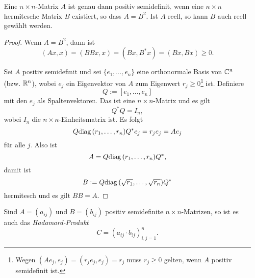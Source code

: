 \begin{thm} %
  Eine $n \times n$-Matrix $A$ ist genau dann positiv semidefinit, wenn eine $n
  \times n$ hermitesche Matrix $B$ existiert, so dass $A = B^2$. Ist $A$ reell,
  so kann $B$ auch reell gewählt werden.
\end{thm}

\begin{proof}
  Wenn $A = B^2$, dann ist
  \[ (Ax,x) = (BBx,x) = (Bx,B^* x) = (Bx, Bx) \ge 0. \]

  Sei $A$ positiv semidefinit und sei $\{e_1, \ldots, e_n\}$ eine orthonormale
  Basis von $\mathbb{C}^n$ (bzw. $\mathbb{R}^n$), wobei $e_j$ ein Eigenvektor von $A$
  zum Eigenwert $r_j \ge 0$\footnote{%
    Wegen $(A e_j, e_j) = (r_j e_j, e_j) = r_j$ muss $r_j \ge 0$ gelten, wenn
    $A$ positiv semidefinit ist.
  } ist. Definiere
  \[ Q := [ e_1, \ldots, e_n] \]
  mit den $e_j$ als Spaltenvektoren. Das ist eine $n \times n$-Matrix und es
  gilt
  \[ Q^* Q = I_n, \]
  wobei $I_n$ die $n \times n$-Einheitsmatrix ist. Es folgt
  \[ Q \mathrm{diag}\, (r_1, \ldots, r_n) Q^* e_j = r_j e_j = A e_j \]
  für alle $j$. Also ist
  \[ A = Q \mathrm{diag}\,( r_1, \ldots, r_n) Q^*, \]
  damit ist
  \[ B := Q \mathrm{diag}\,(\sqrt{r_1}, \ldots, \sqrt{r_n}) Q^* \]
  hermitesch und es gilt $BB = A$.
\end{proof}

\begin{thm} %
  Sind $A = (a_{ij})$ und $B = (b_{ij})$ positiv semidefinite $n \times
  n$-Matrizen, so ist es auch das \emph{Hadamard-Produkt}
  \[ C = (a_{ij} \cdot b_{ij})_{i,j = 1}^n. \]
\end{thm}